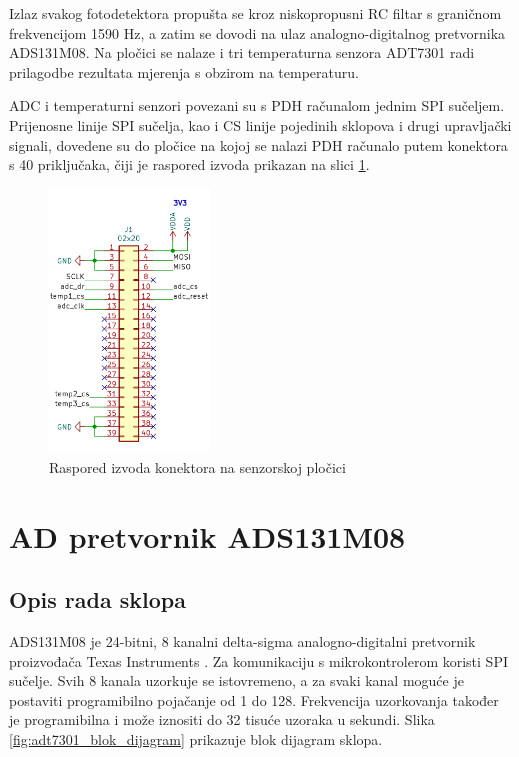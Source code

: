         Izlaz svakog fotodetektora propušta se kroz niskopropusni RC filtar s graničnom frekvencijom 1590 Hz, a zatim se dovodi na ulaz analogno-digitalnog pretvornika ADS131M08. Na pločici se nalaze i tri temperaturna senzora ADT7301 radi prilagodbe rezultata mjerenja s obzirom na temperaturu.
        
        ADC i temperaturni senzori povezani su s PDH računalom jednim SPI sučeljem. Prijenosne linije SPI sučelja, kao i CS linije pojedinih sklopova i drugi upravljački signali, dovedene su do pločice na kojoj se nalazi PDH računalo putem konektora s 40 priključaka, čiji je raspored izvoda prikazan na slici \ref{fig:konektor}.

        \begin{figure}[h]
            \centering
            \includegraphics[height=7cm]{slike/konektor.png}
            \caption{Raspored izvoda konektora na senzorskoj pločici}
            \label{fig:konektor}
        \end{figure}

    \section{AD pretvornik ADS131M08}

        \subsection{Opis rada sklopa}
            ADS131M08 je 24-bitni, 8 kanalni delta-sigma analogno-digitalni pretvornik  proizvođača Texas Instruments \cite{ads131m08_datasheet}. Za komunikaciju s mikrokontrolerom koristi SPI sučelje. Svih 8 kanala uzorkuje se istovremeno, a za svaki kanal moguće je postaviti programibilno pojačanje od 1 do 128. Frekvencija uzorkovanja također je programibilna i može iznositi do 32 tisuće uzoraka u sekundi. Slika \ref{fig:adt7301_blok_dijagram} prikazuje blok dijagram sklopa.

